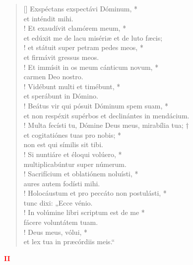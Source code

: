 \begin{verse}[\versewidth]
Exspéctans exspectávi Dóminum, *\\
et inténdit mihi.\\!
\vin Et exaudívit clamórem meum, *\\
\vin et edúxit me de lacu misériæ et de luto fæcis;\\!
et státuit super petram pedes meos, *\\
et firmávit gressus meos.\\!
\vin Et immísit in os meum cánticum novum, *\\
\vin carmen Deo nostro.\\!
Vidébunt multi et timébunt, *\\
et sperábunt in Dómino.\\!
\vin Beátus vir qui pósuit Dóminum spem suam, *\\
\vin et non respéxit supérbos et declinántes in mendácium.\\!
Multa fecísti tu, Dómine Deus meus, mirabília tua; †\\
et cogitatiónes tuas pro nobis; *\\
non est qui símilis sit tibi.\\!
\vin Si nuntiáre et éloqui volúero, *\\
\vin multiplicabúntur super númerum.\\!
Sacrifícium et oblatiónem noluísti, *\\
aures autem fodísti mihi.\\!
\vin Holocáustum et pro peccáto non postulásti, *\\
\vin tunc dixi: „Ecce vénio.\\!
In volúmine libri scriptum est de me *\\
fácere voluntátem tuam.\\!
\vin Deus meus, vólui, *\\
\vin et lex tua in præcórdiis meis.“\\
\end{verse}
\begin{center}
\textcolor{red}{\bf II}
\end{center}
